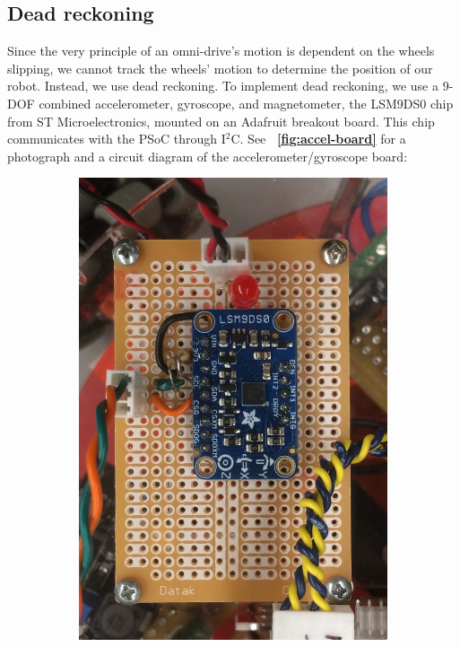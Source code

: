 \documentclass[letterpaper, 11pt]{article}
\newcommand*{\figref}[1]{\textbf{\figurename~\ref{#1}}}
\newcommand{\iic}{I$^2$C\xspace}
\begin{document}
\begin{enumerate}[label=\textbf{\arabic*.}]
\subsection{Dead reckoning}
Since the very principle of an omni-drive's motion is dependent on the wheels slipping, we cannot track the wheels' motion to determine the position of our robot. Instead, we use dead reckoning. To implement dead reckoning, we use a 9-DOF combined accelerometer, gyroscope, and magnetometer, the LSM9DS0 chip from ST Microelectronics, mounted on an Adafruit breakout board. This chip communicates with the PSoC through \iic. See \figref{fig:accel-board} for a photograph and a circuit diagram of the accelerometer/gyroscope board:

\begin{figure}[ht]
    \centering
    \begin{subfigure}[t]{0.48\textwidth}
        \centering
        \includegraphics[height=0.4\textheight]{images/accel.JPG}

\end{subfigure}
\end{figure}
\end{enumerate}
\end{document}

